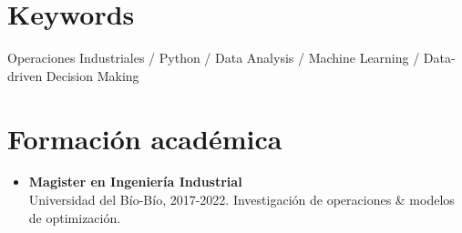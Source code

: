 \documentclass[a4paper,10pt]{article}
\begin{document}
	
		\section*{Keywords}
	\small
	Operaciones Industriales / Python / Data Analysis / Machine Learning /  Data-driven Decision Making
	
	\section*{Formación académica}
	\begin{itemize}[left=0pt]
		\item \textbf{Magister en Ingeniería Industrial} \\
		Universidad del Bío-Bío, 2017-2022. Investigación de operaciones \& modelos de optimización.
		
		
	\end{itemize}
	
\end{document}
